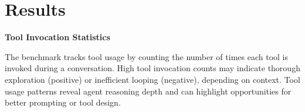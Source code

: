 \section{Results}

\textbf{Tool Invocation Statistics}

The benchmark tracks tool usage by counting the number of times each tool is invoked during a conversation.
High tool invocation counts may indicate thorough exploration (positive) or inefficient looping (negative), depending on context.
Tool usage patterns reveal agent reasoning depth and can highlight opportunities for better prompting or tool design.
